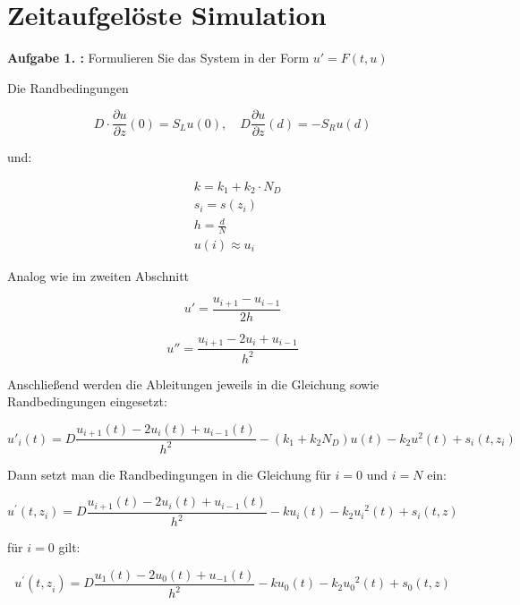 \chapter{Zeitaufgelöste Simulation}
\begin{mybox}
	\textbf{Aufgabe 1. :}	Formulieren Sie das System in der Form $ u' = F(t,u) $
\end{mybox}

Die Randbedingungen

\begin{equation}
	D\cdot \frac{\partial u}{\partial z}(0)=S_Lu(0),\quad D\frac{\partial u}{\partial z}(d)=-S_Ru(d)
\end{equation}

und:

\begin{align*}
	&k=k_1+k_2\cdot N_D\\
	&s_i=s(z_i)\\
	&h=\frac{d}{N}\\
	&u(i)\approx u_i
\end{align*}

Analog wie im zweiten Abschnitt

\begin{equation}
	u' =\frac{u_{i+1} -u_{i-1}}{2h}
\end{equation}

\begin{equation}
	u''=\frac{u_{i+1} -{2u}_i +u_{i-1} }{h^2 }
\end{equation}

Anschließend werden die Ableitungen jeweils in die Gleichung sowie Randbedingungen eingesetzt:

\begin{equation}
	u'_i\left(t\right)=D\frac{u_{i+1} \left(t\right)-{2u}_i \left(t\right)+u_{i-1} \left(t\right)}{h^2 }-\left(k_1 +k_2 N_D \right)u\left(t\right)-k_2 u^2 \left(t\right)+s_i \left(t,z_i \right)
\end{equation}

Dann setzt man die Randbedingungen in die Gleichung für $ i = 0 $ und $ i = N $ ein:

\begin{equation}
	u^{\prime } \left(t,z_i \right)=D\frac{u_{i+1} \left(t\right)-{2u}_i \left(t\right)+u_{i-1} \left(t\right)}{h^2 }-ku_i \left(t\right)-k_2 {u_i }^2 \left(t\right)+s_i \left(t,z\right)
\end{equation}

für $ i = 0 $ gilt:

\begin{equation}
	u^{\prime } \left(t{,z}_i \right)=D\frac{u_1 \left(t\right)-{2u}_0 \left(t\right)+u_{-1} \left(t\right)}{h^2 }-ku_0 \left(t\right)-k_2 {u_0 }^2 \left(t\right)+s_0 \left(t,z\right)
\end{equation}

